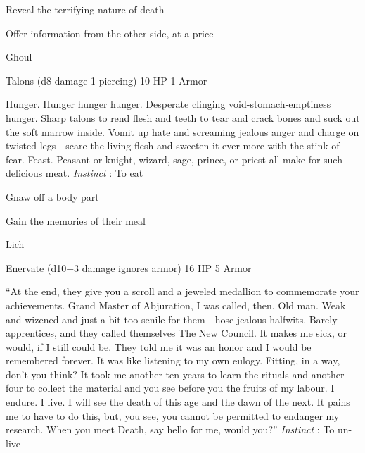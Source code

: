 \startitemize[1,packed]

\item Reveal the terrifying nature of death

 
\item Offer information from the other side, at a price


\stopitemize
 
\startMonsterName
Ghoul	 
\stopMonsterName
 

Talons (d8 damage 1 piercing)	10 HP	1 Armor

 


 
\startMonsterDescription
Hunger.  Hunger hunger hunger.  Desperate clinging void-stomach-emptiness hunger.  Sharp talons to rend flesh and teeth to tear and crack bones and suck out the soft marrow inside.  Vomit up hate and screaming jealous anger and charge on twisted legs—scare the living flesh and sweeten it ever more with the stink of fear.  Feast.  Peasant or knight, wizard, sage, prince, or priest all make for such delicious meat. {\em Instinct} : To eat
\stopMonsterDescription
 
\startitemize[1,packed]

\item Gnaw off a body part

 
\item Gain the memories of their meal


\stopitemize
 
\startMonsterName
Lich	 
\stopMonsterName
 

Enervate (d10+3 damage ignores armor)	16 HP	5 Armor

 


 
\startMonsterDescription
“At the end, they give you a scroll and a jeweled medallion to commemorate your achievements.  Grand Master of Abjuration, I was called, then.  Old man.  Weak and wizened and just a bit too senile for them—hose jealous halfwits.  Barely apprentices, and they called themselves The New Council.  It makes me sick, or would, if I still could be.  They told me it was an honor and I would be remembered forever.  It was like listening to my own eulogy.  Fitting, in a way, don’t you think?  It took me another ten years to learn the rituals and another four to collect the material and you see before you the fruits of my labour.  I endure.  I live.  I will see the death of this age and the dawn of the next.  It pains me to have to do this, but, you see, you cannot be permitted to endanger my research.  When you meet Death, say hello for me, would you?” {\em Instinct} : To un-live
\stopMonsterDescription
 
